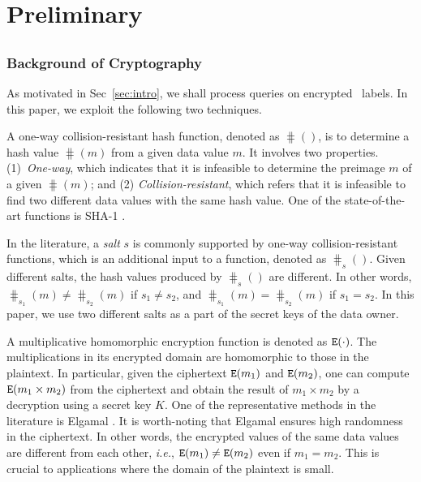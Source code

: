 \section{Preliminary}
\label{sec:preliminary}

\subsection{\hop}
\label{subsec:hop}

\subsubsection{Background of Cryptography}
\label{subsec:encryption}

As motivated in Sec~\ref{sec:intro}, we shall process queries on
encrypted \hop\ labels. In this paper, we exploit the following two techniques.

\stab
{} A one-way
collision-resistant hash function, denoted as $\hash()$, is to determine a hash
value $\hash(m)$ from a given data value $m$. It involves two properties. (1)~{\em One-way}, which indicates that it is infeasible to determine the preimage
$m$ of a given $\hash(m)$; and (2) {\em Collision-resistant}, which refers that
it is infeasible to find two different data values with the same hash value. One
of the state-of-the-art functions is SHA-1 \cite{sha}.

In the literature, a {\em salt} $s$ is commonly supported by one-way
collision-resistant functions, which is an additional input to a function,
denoted as $\hash_s()$. Given different salts, the hash values produced by
$\hash_s()$ are different. In other words, $\hash_{s_1}(m) \neq \hash_{s_2}(m)$
if $s_1 \neq s_2$, and $\hash_{s_1}(m) = \hash_{s_2}(m)$ if $s_1 = s_2$. In this
paper, we use two different salts as a part of the secret keys of the data
owner.

\stab
{} A
multiplicative homomorphic encryption function is denoted as
${\tt E}(\cdot)$.  The multiplications in its encrypted domain are
homomorphic to those in the plaintext. In particular, given the
ciphertext ${\tt E}(m_1)$ and ${\tt E}(m_2)$, one can compute
${\tt E}(m_1 \times m_2)$ from the ciphertext and obtain the result of
$m_1 \times m_2$ by a decryption using a secret key $K$. One of the
representative methods in the literature is Elgamal \cite{elgamal}. It
is worth-noting that Elgamal ensures high randomness in the
ciphertext. In other words, the encrypted values of the same data
values are different from each other, {\it i.e.}, ${\tt E}(m_1) \neq
{\tt E}(m_2)$ even if $m_1 = m_2$. This is crucial to applications
where the domain of the plaintext is small.
